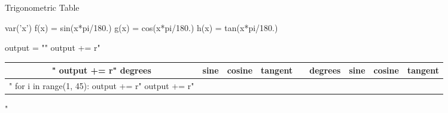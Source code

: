 \documentclass[12pt]{article}
\begin{document}
\pagestyle{empty}
\begin{center}
{\LARGE Trigonometric Table}
\end{center}
\begin{sagesilent}
var('x')
f(x) = sin(x*pi/180.)
g(x) = cos(x*pi/180.)
h(x) = tan(x*pi/180.)

output = ""
output += r"\begin{tabular}{ccccccccc} "
output += r" degrees & sine & cosine & tangent & & degrees & sine & cosine & tangent \\ \hline "
for i in range(1, 45):
    output += r"%
output += r"\end{tabular}"
\end{sagesilent}
\begin{center}
\end{center}
\end{document}
